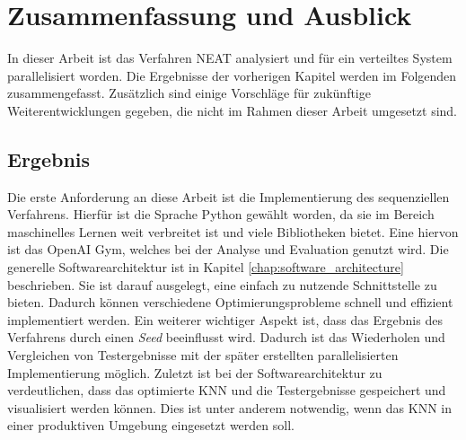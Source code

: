\chapter{Zusammenfassung und Ausblick}
In dieser Arbeit ist das Verfahren \ac{NEAT} analysiert und für ein verteiltes System parallelisiert worden. Die Ergebnisse der vorherigen Kapitel werden im Folgenden zusammengefasst. Zusätzlich sind einige Vorschläge für zukünftige Weiterentwicklungen gegeben, die nicht im Rahmen dieser Arbeit umgesetzt sind.  

\section{Ergebnis}
Die erste Anforderung an diese Arbeit ist die Implementierung des sequenziellen Verfahrens. Hierfür ist die Sprache Python gewählt worden, da sie im Bereich maschinelles Lernen weit verbreitet ist und viele Bibliotheken bietet. Eine hiervon ist das OpenAI Gym, welches bei der Analyse und Evaluation genutzt wird. Die generelle Softwarearchitektur ist in Kapitel \ref{chap:software_architecture} beschrieben. Sie ist darauf ausgelegt, eine einfach zu nutzende Schnittstelle zu bieten. Dadurch können verschiedene Optimierungsprobleme schnell und effizient implementiert werden. Ein weiterer wichtiger Aspekt ist, dass das Ergebnis des Verfahrens durch einen \emph{Seed} beeinflusst wird. Dadurch ist das Wiederholen und Vergleichen von Testergebnisse mit der später erstellten parallelisierten Implementierung möglich. Zuletzt ist bei der Softwarearchitektur zu verdeutlichen, dass das optimierte \ac{KNN} und die Testergebnisse gespeichert und visualisiert werden können. Dies ist unter anderem notwendig, wenn das \ac{KNN} in einer produktiven Umgebung eingesetzt werden soll.
\\\\
